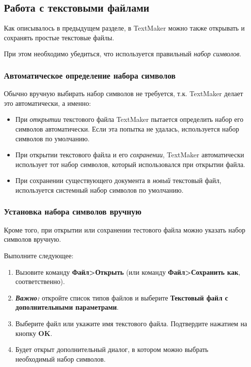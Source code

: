 ﻿\documentclass[a4paper,10pt]{article}
\begin{document}
\subsection{Работа с текстовыми файлами}
Как описывалось в предыдущем разделе, в TextMaker можно также открывать и сохранять простые текстовые файлы.

При этом необходимо убедиться, что используется правильный \textit{набор символов}.

\subsubsection{Автоматическое определение набора символов}
Обычно вручную выбирать набор символов не требуется, т.к. TextMaker делает это автоматически, а именно:
\begin{itemize}
 \item При \textit{открытии} текстового файла TextMaker пытается определить набор его символов автоматически. Если эта попытка не удалась, используется набор символов по умолчанию.
 \item При открытии текстового файла и его \textit{сохранении}, TextMaker автоматически использует тот набор символов, который использовался при открытии файла.
 \item При сохранении существующего документа в \textit{новый} текстовый файл, используется системный набор символов по умолчанию.
\end{itemize}

\subsubsection{Установка набора символов вручную}
 Кроме того, при открытии или сохранении тестового файла можно указать набор символов вручную.
 
 Выполните следующее:
 \begin{enumerate}
  \item Вызовите команду \textbf{Файл>Открыть} (или команду \textbf{Файл>Сохранить как}, соответственно).
  \item \textbf{\textit{Важно:}} откройте список типов файлов и выберите \textbf{Текстовый файл с дополнительными параметрами}.
  \item Выберите файл или укажите имя текстового файла. Подтвердите нажатием на кнопку \textbf{OK}.
  \item Будет открыт дополнительный диалог, в котором можно выбрать необходимый набор символов.
 \end{enumerate}
\end{document}
